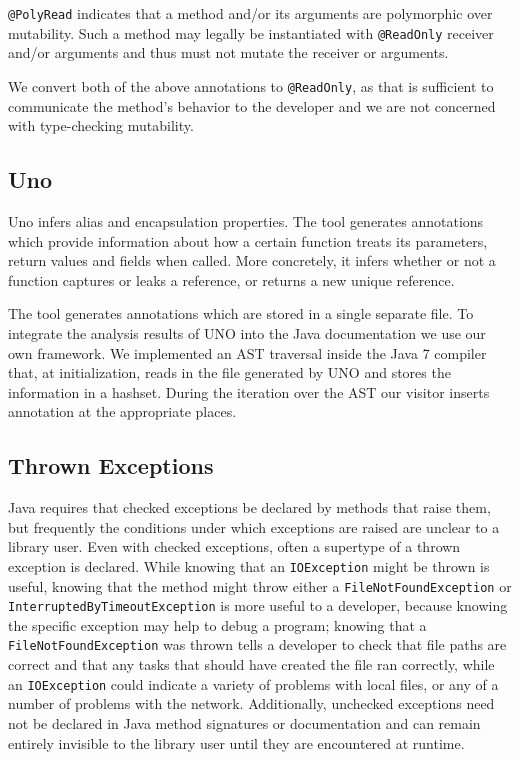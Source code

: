 \texttt{@PolyRead} indicates that a method and/or its arguments are polymorphic
over mutability. Such a method may legally be instantiated with
\texttt{@ReadOnly} receiver and/or arguments and thus must not mutate the
receiver or arguments.

We convert both of the above annotations to \texttt{@ReadOnly}, as
that is sufficient to communicate the method's behavior to the developer and we
are not concerned with type-checking mutability.

\subsection{Uno}

Uno infers alias and encapsulation properties.  The
tool generates annotations which provide information about how a certain
function treats its parameters, return values and fields when called. More
concretely, it infers whether or not a function captures or leaks a
reference, or returns a new unique reference.

The tool generates annotations which are stored in a single separate file. 
To integrate the analysis results of UNO into the Java documentation we
use our own framework. We implemented an AST traversal inside the Java 7 
compiler that, at initialization, reads in the file generated by UNO and 
stores the information in a hashset. During the iteration over the AST
our visitor inserts annotation at the appropriate places.

\subsection{Thrown Exceptions}

Java requires that checked exceptions be declared by methods that raise them,
but frequently the conditions under which exceptions are raised are unclear to a
library user. Even with checked exceptions, often a supertype of a thrown
exception is declared.  While knowing that an \texttt{IOException} might be
thrown is useful, knowing that the method might throw either a
\texttt{FileNotFoundException} or \texttt{InterruptedByTimeoutException} is more
useful to a developer, because knowing the specific exception may help to debug
a program; knowing that a \texttt{FileNotFoundException} was thrown tells a
developer to check that file paths are correct and that any tasks that should
have created the file ran correctly, while an \texttt{IOException} could
indicate a variety of problems with local files, or any of a number of problems
with the network.  Additionally, unchecked exceptions need not be declared in Java method
signatures or documentation and can remain entirely invisible to the library
user until they are encountered at runtime.

